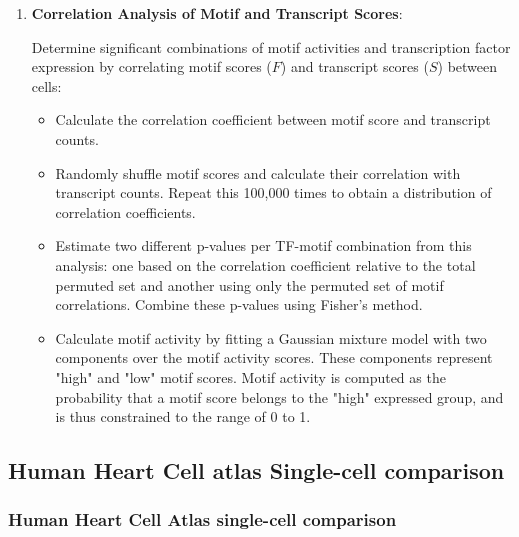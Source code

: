 \begin{enumerate}
    \item \textbf{Correlation Analysis of Motif and Transcript Scores}:
    
    Determine significant combinations of motif activities and transcription factor expression by correlating motif scores ($F$) and transcript scores ($S$) between cells:
    \begin{itemize}
        \item Calculate the correlation coefficient between motif score and transcript counts.
        \item Randomly shuffle motif scores and calculate their correlation with transcript counts. Repeat this 100,000 times to obtain a distribution of correlation coefficients.
        \item Estimate two different p-values per TF-motif combination from this analysis: one based on the correlation coefficient relative to the total permuted set and another using only the permuted set of motif correlations. Combine these p-values using Fisher's method.
        \item Calculate motif activity by fitting a Gaussian mixture model with two components over the motif activity scores. These components represent "high" and "low" motif scores. Motif activity is computed as the probability that a motif score belongs to the "high" expressed group, and is thus constrained to the range of 0 to 1.
    \end{itemize}
\end{enumerate}

\subsection{Human Heart Cell atlas Single-cell comparison}

\subsubsection{Human Heart Cell Atlas single-cell comparison}


